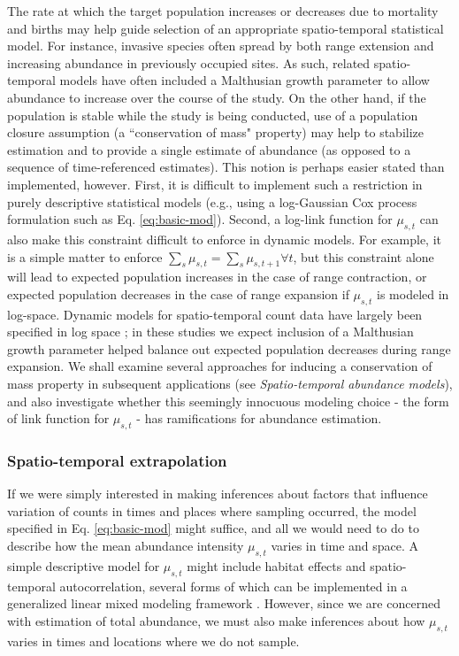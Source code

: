 \documentclass[12pt,english]{article}
\begin{document}
\begin{spacing}{1.9}
The rate at which the target population increases or decreases due to mortality and births may help guide selection
of an appropriate spatio-temporal statistical model.  For instance, invasive species often spread by both range extension and increasing abundance in previously occupied sites.  As such, related spatio-temporal models have often included a Malthusian growth parameter \citep[e.g.,][]{Wikle2003,HootenWikle2008} to allow abundance to increase over the course of the study.  On the other hand, if the population is stable while the study is being conducted, use of a population closure assumption (a ``conservation of mass" property) may help to stabilize estimation and to provide a single estimate of abundance (as opposed to a sequence of time-referenced estimates).  This notion is perhaps easier stated than implemented, however. First, it is difficult to implement such a restriction in purely descriptive statistical models (e.g., using a log-Gaussian Cox process formulation such as Eq. \ref{eq:basic-mod}). Second, a log-link function for $\mu_{s,t}$ can also make this constraint difficult to enforce in dynamic models.  For example, it is a simple matter to enforce $\sum_s \mu_{s,t} = \sum_s \mu_{s,t+1} \forall t$, but this constraint alone will lead to expected population increases in the case of range contraction, or expected population decreases in the case of range expansion if $\mu_{s,t}$ is modeled in log-space.  Dynamic models for spatio-temporal count data have largely been specified in log space \citep[e.g.,][]{Wikle2003,HootenWikle2008}; in these studies we expect inclusion of a Malthusian growth parameter helped balance out expected population decreases during range expansion.
We shall examine several approaches for inducing a conservation of mass property in subsequent applications (see {\it Spatio-temporal abundance models}), and also investigate whether this seemingly innocuous modeling choice - the form of link function for $\mu_{s,t}$ - has ramifications for abundance estimation.

\subsubsection{Spatio-temporal extrapolation}

If we were simply interested in making inferences about factors that influence variation of counts in times and places where sampling occurred, the model specified in Eq. \ref{eq:basic-mod} might suffice, and all we would need to do to describe how the mean abundance intensity $\mu_{s,t}$ varies in time and space.  A simple descriptive model for $\mu_{s,t}$ might include habitat effects and spatio-temporal autocorrelation, several forms of which can be implemented in a generalized linear mixed modeling framework \citep[see e.g.,][]{RossEtAl2012}.  However, since we are concerned with estimation of total abundance, we must also make inferences about how $\mu_{s,t}$ varies in times and locations where we do not sample.


\end{spacing}
\end{document}
